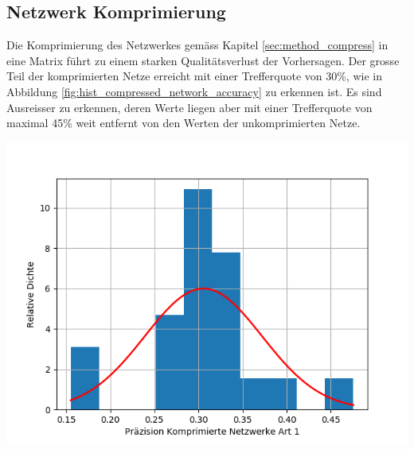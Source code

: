 \documentclass[Interploate_hadwritten_Digits.tex]{subfiles}
\begin{document}
	\subsection{Netzwerk Komprimierung}
	\label{sec:results_compression}
	Die Komprimierung des Netzwerkes gemäss Kapitel \ref{sec:method_compress} in eine Matrix führt zu einem starken Qualitätsverlust der Vorhersagen. Der grosse Teil der komprimierten Netze erreicht mit einer Trefferquote von 30\%, wie in Abbildung \ref{fig:hist_compressed_network_accuracy} zu erkennen ist. Es sind Ausreisser zu erkennen, deren Werte liegen aber mit einer Trefferquote von maximal 45\% weit entfernt von den Werten der unkomprimierten Netze.
	\begin{Figure}
		\centering
		\includegraphics[width=\linewidth]{img/results/histogram_compressed_network_accuracy.png}
		\label{fig:hist_compressed_network_accuracy}
	\end{Figure}
\end{document}
